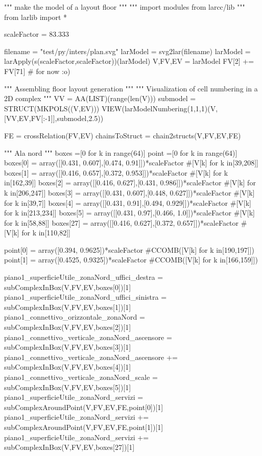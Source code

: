 """ make the model of a layout floor """
""" import modules from larcc/lib """
from larlib import *

scaleFactor = 83.333

filename = "test/py/inters/plan.svg"
larModel = svg2lar(filename)
larModel = larApply(s(scaleFactor,scaleFactor))(larModel)
V,FV,EV = larModel
FV[2] += FV[71]      # for now :o)

""" Assembling floor layout generation """
""" Visualization of cell numbering in a 2D complex """
VV = AA(LIST)(range(len(V)))
submodel = STRUCT(MKPOLS((V,EV)))
VIEW(larModelNumbering(1,1,1)(V,[VV,EV,FV[:-1]],submodel,2.5))

FE = crossRelation(FV,EV)
chainsToStruct = chain2structs(V,FV,EV,FE)

""" Ala nord """
boxes =[0 for k in range(64)]
point =[0 for k in range(64)]
boxes[0] = array([[0.431, 0.607],[0.474, 0.91]])*scaleFactor #[V[k] for k in[39,208]]
boxes[1] = array([[0.416, 0.657],[0.372, 0.953]])*scaleFactor #[V[k] for k in[162,39]]
boxes[2] = array([[0.416, 0.627],[0.431, 0.986]])*scaleFactor #[V[k] for k in[206,247]]
boxes[3] = array([[0.431, 0.607],[0.448, 0.627]])*scaleFactor #[V[k] for k in[39,7]]
boxes[4] = array([[0.431, 0.91],[0.494, 0.929]])*scaleFactor  #[V[k] for k in[213,234]]
boxes[5] = array([[0.431, 0.97],[0.466, 1.0]])*scaleFactor #[V[k] for k in[58,88]]
boxes[27] = array([[0.416, 0.627],[0.372, 0.657]])*scaleFactor #[V[k] for k in[110,82]]

point[0] = array([0.394, 0.9625])*scaleFactor #CCOMB([V[k] for k in[190,197]])
point[1] = array([0.4525, 0.9325])*scaleFactor #CCOMB([V[k] for k in[166,159]])

piano1_superficieUtile_zonaNord_uffici_destra = subComplexInBox(V,FV,EV,boxes[0])[1]
piano1_superficieUtile_zonaNord_uffici_sinistra = subComplexInBox(V,FV,EV,boxes[1])[1]
piano1_connettivo_orizzontale_zonaNord = subComplexInBox(V,FV,EV,boxes[2])[1]
piano1_connettivo_verticale_zonaNord_ascensore = subComplexInBox(V,FV,EV,boxes[3])[1]
piano1_connettivo_verticale_zonaNord_ascensore += subComplexInBox(V,FV,EV,boxes[4])[1]
piano1_connettivo_verticale_zonaNord_scale = subComplexInBox(V,FV,EV,boxes[5])[1]
piano1_superficieUtile_zonaNord_servizi = subComplexAroundPoint(V,FV,EV,FE,point[0])[1]
piano1_superficieUtile_zonaNord_servizi += subComplexAroundPoint(V,FV,EV,FE,point[1])[1]
piano1_superficieUtile_zonaNord_servizi += subComplexInBox(V,FV,EV,boxes[27])[1]

